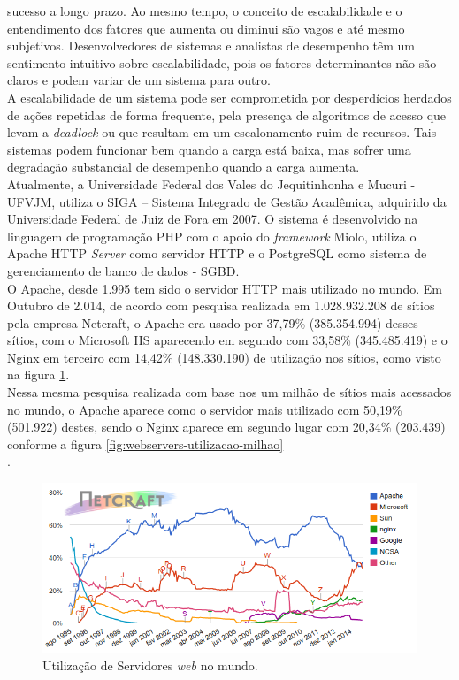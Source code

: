 sucesso a longo prazo. Ao mesmo tempo, o conceito de escalabilidade e o 
entendimento dos fatores que aumenta ou diminui são vagos e até mesmo 
subjetivos. Desenvolvedores de sistemas e analistas de desempenho têm um 
sentimento intuitivo sobre escalabilidade, pois os fatores determinantes não 
são claros e podem variar de um sistema para outro.\\
A escalabilidade de um sistema pode ser comprometida por desperdícios herdados 
de ações repetidas de forma frequente, pela presença de algoritmos de acesso 
que levam a \textit{deadlock} ou que resultam em um escalonamento ruim de 
recursos. Tais sistemas podem funcionar bem quando a carga está baixa, mas 
sofrer uma degradação substancial de desempenho quando a carga aumenta.\\
Atualmente, a Universidade Federal dos Vales do Jequitinhonha e Mucuri - UFVJM, 
utiliza o SIGA – Sistema Integrado de Gestão Acadêmica, 
adquirido da Universidade Federal de Juiz de Fora em 2007. O sistema é 
desenvolvido na linguagem de programação PHP com o apoio do \textit{framework} 
Miolo, utiliza o Apache HTTP \textit{Server} como servidor HTTP e o PostgreSQL 
como sistema de gerenciamento de banco de dados - SGBD.\\
O Apache, desde 1.995 tem sido o servidor HTTP mais utilizado no mundo. Em 
Outubro de 2.014, de acordo com pesquisa realizada em 1.028.932.208 de sítios 
pela empresa Netcraft, o Apache era usado por 37,79\% (385.354.994) desses 
sítios, com o Microsoft IIS aparecendo em segundo com 33,58\% (345.485.419) e o 
Nginx em terceiro com 14,42\% (148.330.190) de utilização nos sítios, como 
visto na figura \ref{fig:webservers-utilizacao}.\\
Nessa mesma pesquisa realizada com base nos um milhão de sítios mais acessados 
no mundo, o Apache aparece como o servidor mais utilizado com 50,19\% 
(501.922) destes, sendo o Nginx aparece em segundo lugar com 20,34\% 
(203.439) conforme a figura \ref{fig:webservers-utilizacao-milhao}\\.
\begin{figure}[htb]
	\centering
	\includegraphics[width=1\linewidth]{figuras/grafico1}
	\caption{Utilização de Servidores \textit{web} no mundo.}
	\label{fig:webservers-utilizacao}
\end{figure}


